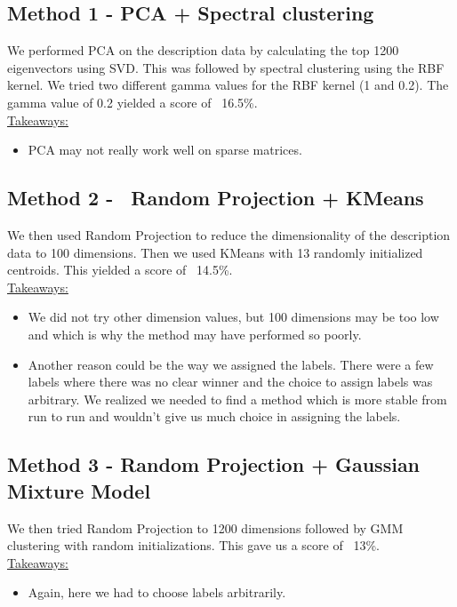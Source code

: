 \documentclass{article}
\begin{document}
\subsection*{Method 1 - PCA + Spectral clustering}
We performed PCA on the description data by calculating the top 1200 eigenvectors using SVD. This was followed by spectral clustering using the RBF kernel. We tried two different gamma values for the RBF kernel (1 and 0.2). The gamma value of 0.2 yielded a score of ~16.5\%.\\
\underline{Takeaways:}\\
\vspace{-0.5cm}
\begin{itemize}
\item PCA may not really work well on sparse matrices. 
\end{itemize}

\subsection*{Method 2 -  Random Projection + KMeans}
We then used Random Projection to reduce the dimensionality of the description data to 100 dimensions. Then we used KMeans with 13 randomly initialized centroids. This yielded a score of ~14.5\%.\\
\underline{Takeaways:}\\
\vspace{-0.5cm}
\begin{itemize}
\item We did not try other dimension values, but 100 dimensions may be too low and which is why the method may have performed so poorly. 
\item Another reason could be the way we assigned the labels. There were a few labels where there was no clear winner and the choice to assign labels was arbitrary. We realized we needed to find a method which is more stable from run to run and wouldn’t give us much choice in assigning the labels.
\end{itemize}

\subsection*{Method 3 - Random Projection + Gaussian Mixture Model}
We then tried Random Projection to 1200 dimensions followed by GMM clustering with random initializations. This gave us a score of ~13\%.\\ 
\underline{Takeaways:}\\
\vspace{-0.5cm}
\begin{itemize}
\item Again, here we had to choose labels arbitrarily. 
\end{itemize}
\end{document}

